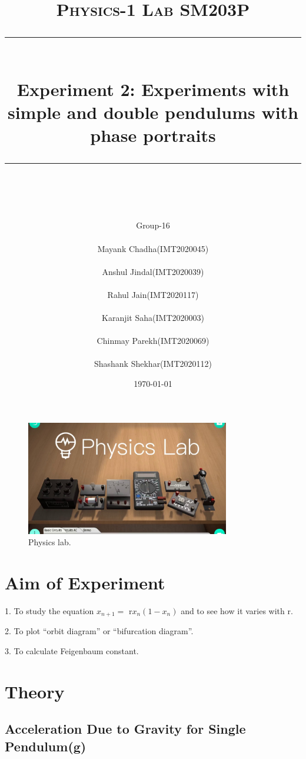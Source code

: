\documentclass[11pt]{scrartcl} %
\title{	
	\normalfont\normalsize
	\textsc{\Huge Physics-1 Lab SM203P}\\ %
	\vspace{25pt} %
	\rule{\linewidth}{0.5pt}\\ %
	\vspace{20pt} %
	{\huge Experiment 2: Experiments with simple and double pendulums with phase portraits}\\ %
	\vspace{12pt} %
	\rule{\linewidth}{2pt}\\ %
	\vspace{12pt} %
}
\author{\Huge Group-16\\
\\
\LARGE Mayank Chadha(IMT2020045)\\
\\
\LARGE Anshul Jindal(IMT2020039)\\
\\
\LARGE Rahul Jain(IMT2020117)\\
\\
\LARGE Karanjit Saha(IMT2020003)\\
\\
\LARGE Chinmay Parekh(IMT2020069)\\
\\
\LARGE Shashank Shekhar(IMT2020112)} %
\date{\normalsize\today} %
\begin{document}
\maketitle %

\begin{figure}[h] %
	\centering
	\includegraphics[width=\textwidth, height=5cm]{first.jpg} %
	\caption{Physics lab.}
\end{figure}

\section{Aim of Experiment}
1. To study the equation $x_{n+1} =$ r$x_n(1−x_n)$ and to see how it varies with r.\par
2.  To plot “orbit diagram” or “bifurcation diagram”. \par
3. To calculate Feigenbaum constant.  \par





\section{Theory}


\subsection{Acceleration Due to Gravity for Single Pendulum(g)}
\end{document}
